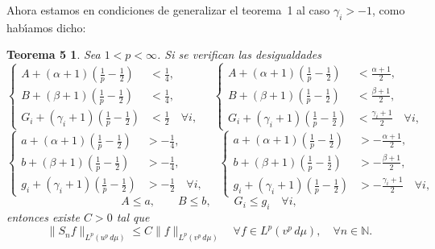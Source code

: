 \documentclass[a4paper,12pt]{article}
\theoremstyle{plain}
\newtheorem*{theoremFive}{Teorema 5}
\theoremstyle{definition}
\newcommand{\N}{\mathbb{N}}
\begin{document}
Ahora estamos en condiciones de generalizar el teorema~1 al caso
$\gamma_{i} > -1$, como hab\'{\i}amos dicho:

\begin{theoremFive}
Sea $1 < p < \infty$.
Si se verifican las desigualdades
$$
\left\{
\begin{aligned}
A + (\alpha+1) \left(\frac{1}{p} - \frac{1}{2}\right) &< \frac{1}{4}, \\
B + (\beta+1) \left(\frac{1}{p} - \frac{1}{2}\right) &< \frac{1}{4}, \\
G_{i} + (\gamma_{i}+1) \left(\frac{1}{p} - \frac{1}{2}\right) &< \frac{1}{2}
\quad \forall i,
\end{aligned}
\right.
\quad
\left\{
\begin{aligned}
A + (\alpha+1) \left(\frac{1}{p} - \frac{1}{2}\right) &< \frac{\alpha+1}{2}, \\
B + (\beta+1) \left(\frac{1}{p} - \frac{1}{2}\right) &< \frac{\beta+1}{2}, \\
G_{i} + (\gamma_{i}+1) \left(\frac{1}{p} - \frac{1}{2}\right) &< \frac{\gamma_{i}+1}{2}
\quad \forall i,
\end{aligned}
\right.
$$
$$
\left\{
\begin{aligned}
a + (\alpha+1) \left(\frac{1}{p} - \frac{1}{2}\right) &> - \frac{1}{4}, \\
b + (\beta+1) \left(\frac{1}{p} - \frac{1}{2}\right) &> - \frac{1}{4}, \\
g_{i} + (\gamma_{i}+1) \left(\frac{1}{p} - \frac{1}{2}\right) &> - \frac{1}{2}
\quad \forall i,
\end{aligned}
\right.
\quad
\left\{
\begin{aligned}
a + (\alpha+1) \left(\frac{1}{p} - \frac{1}{2}\right) &> - \frac{\alpha+1}{2}, \\
b + (\beta+1) \left(\frac{1}{p} - \frac{1}{2}\right) &> - \frac{\beta+1}{2}, \\
g_{i} + (\gamma_{i}+1) \left(\frac{1}{p} - \frac{1}{2}\right) &> - \frac{\gamma_{i}+1}{2}
\quad \forall i,
\end{aligned}
\right.
$$
$$
A \leq a, \qquad B \leq b, \qquad G_{i} \leq g_{i}
\quad \forall i,
$$
entonces existe $C > 0$ tal que
$$
\| S_{n}f \|_{L^{p}(u^{p}\,d\mu)}
\leq C \| f \|_{L^{p}(v^{p}\,d\mu)}
\quad \forall f \in L^{p}(v^{p}\,d\mu),
\quad \forall n \in \N.
$$
\end{theoremFive}
\end{document}
